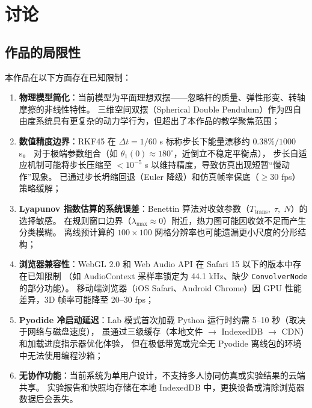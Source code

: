 \section{讨论}

\subsection{作品的局限性}

本作品在以下方面存在已知限制：

\begin{enumerate}[label=(\arabic*), leftmargin=*]
  \item \textbf{物理模型简化}：当前模型为平面理想双摆——忽略杆的质量、弹性形变、转轴摩擦的非线性特性。
       三维空间双摆（Spherical Double Pendulum）作为四自由度系统具有更复杂的动力学行为，但超出了本作品的教学聚焦范围；

  \item \textbf{数值精度边界}：RKF45 在 $\Delta t = 1/60$ s 标称步长下能量漂移约 $0.38\%/1000$ s。
       对于极端参数组合（如 $\theta_1(0) \approx 180^\circ$，近倒立不稳定平衡点），
       步长自适应机制可能将步长压缩至 $< 10^{-5}$ s 以维持精度，导致仿真出现短暂“慢动作”现象。
       已通过步长坍缩回退（Euler 降级）和仿真帧率保底（$\geq 30$ fps）策略缓解；

  \item \textbf{Lyapunov 指数估算的系统误差}：Benettin 算法对收敛参数（$T_\text{trans},\;\tau,\;N$）的选择敏感。
       在规则窗口边界（$\lambda_{\max} \approx 0$）附近，热力图可能因收敛不足而产生分类模糊。
       离线预计算的 $100 \times 100$ 网格分辨率也可能遗漏更小尺度的分形结构；

  \item \textbf{浏览器兼容性}：WebGL 2.0 和 Web Audio API 在 Safari 15 以下的版本中存在已知限制
      （如 AudioContext 采样率锁定为 44.1 kHz、缺少 \texttt{ConvolverNode} 的部分功能）。
      移动端浏览器（iOS Safari、Android Chrome）因 GPU 性能差异，3D 帧率可能降至 20--30 fps；

  \item \textbf{Pyodide 冷启动延迟}：Lab 模式首次加载 Python 运行时约需 5--10 秒（取决于网络与磁盘速度），
      虽通过三级缓存（本地文件 $\to$ IndexedDB $\to$ CDN）和加载进度指示器优化体验，
      但在极低带宽或完全无 Pyodide 离线包的环境中无法使用编程沙箱；

  \item \textbf{无协作功能}：当前系统为单用户设计，不支持多人协同仿真或实验结果的云端共享。
      实验报告和快照均存储在本地 IndexedDB 中，更换设备或清除浏览器数据后会丢失。
\end{enumerate}

